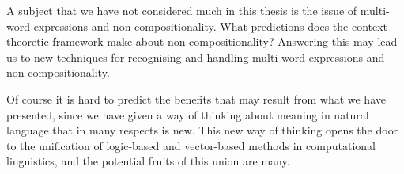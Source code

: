 A subject that we have not considered much in this thesis is the issue of multi-word expressions and non-compositionality. What predictions does the context-theoretic framework make about non-compositionality? Answering this may lead us to new techniques for recognising and handling multi-word expressions and non-compositionality.


Of course it is hard to predict the benefits that may result from what we have presented, since we have given a way of thinking about meaning in natural language that in many respects is new. This new way of thinking opens the door to the unification of logic-based and vector-based methods in computational linguistics, and the potential fruits of this union are many.

